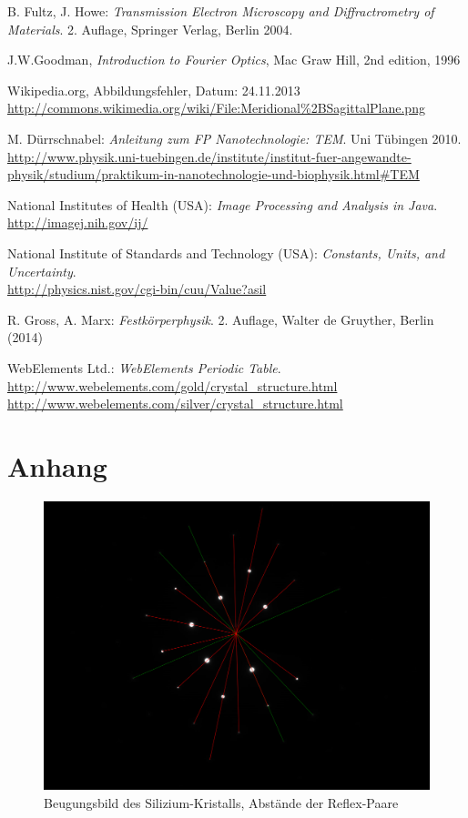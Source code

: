 \documentclass[a4paper, parskip=half, 12pt, bibliography=totocnumbered]{scrartcl}
\begin{document}





\begin{thebibliography}{10}
 B. Fultz, J. Howe: \emph{Transmission Electron Microscopy and Diffractrometry of Materials}. 2. Auflage, Springer Verlag, Berlin 2004.

 J.W.Goodman, \emph{Introduction to Fourier Optics}, Mac Graw Hill, 2nd edition, 1996

 Wikipedia.org, Abbildungsfehler, Datum: 24.11.2013\\
\url{http://commons.wikimedia.org/wiki/File:Meridional%2BSagittalPlane.png}

 M. Dürrschnabel: \emph{Anleitung zum FP Nanotechnologie: TEM}. Uni Tübingen 2010.\\
\url{http://www.physik.uni-tuebingen.de/institute/institut-fuer-angewandte-physik/studium/praktikum-in-nanotechnologie-und-biophysik.html#TEM}

 National Institutes of Health (USA): \emph{Image Processing and Analysis in Java}.\\
\url{http://imagej.nih.gov/ij/}

 National Institute of Standards and Technology (USA): \emph{Constants, Units, and Uncertainty}.\\
\url{http://physics.nist.gov/cgi-bin/cuu/Value?asil}

 R. Gross, A. Marx: \emph{Festkörperphysik}. 2. Auflage, Walter de Gruyther, Berlin (2014)

 WebElements Ltd.: \emph{WebElements Periodic Table}.\\
\url{http://www.webelements.com/gold/crystal_structure.html}\\
\url{http://www.webelements.com/silver/crystal_structure.html}
\end{thebibliography}

\newpage
\section{Anhang}
\begin{figure}[h]
	\centering
	\includegraphics[width=\textwidth]{data/Im_22b}
	\caption{Beugungsbild des Silizium-Kristalls, Abstände der Reflex-Paare}
\end{figure}
\end{document}
